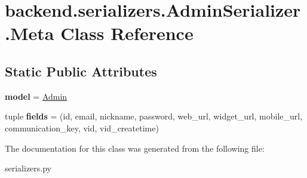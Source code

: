 \hypertarget{classbackend_1_1serializers_1_1_admin_serializer_1_1_meta}{}\section{backend.\+serializers.\+Admin\+Serializer.\+Meta Class Reference}
\label{classbackend_1_1serializers_1_1_admin_serializer_1_1_meta}
\subsection*{Static Public Attributes}
\begin{DoxyCompactItemize}
\item 
\mbox{\label{classbackend_1_1serializers_1_1_admin_serializer_1_1_meta_a78d97ca03730721da56aab4c49f8d13c}} 
{\bfseries model} = \hyperlink{classbackend_1_1models_1_1_admin}{Admin}
\item 
\mbox{\label{classbackend_1_1serializers_1_1_admin_serializer_1_1_meta_a74859ad8304c06766af6e1819ab4c63f}} 
tuple {\bfseries fields} = (\textquotesingle{}id\textquotesingle{}, \textquotesingle{}email\textquotesingle{}, \textquotesingle{}nickname\textquotesingle{}, \textquotesingle{}password\textquotesingle{}, \textquotesingle{}web\+\_\+url\textquotesingle{}, \textquotesingle{}widget\+\_\+url\textquotesingle{}, \textquotesingle{}mobile\+\_\+url\textquotesingle{}, \textquotesingle{}communication\+\_\+key\textquotesingle{}, \textquotesingle{}vid\textquotesingle{}, \textquotesingle{}vid\+\_\+createtime\textquotesingle{})
\end{DoxyCompactItemize}


The documentation for this class was generated from the following file\+:\begin{DoxyCompactItemize}
\item 
serializers.\+py\end{DoxyCompactItemize}
